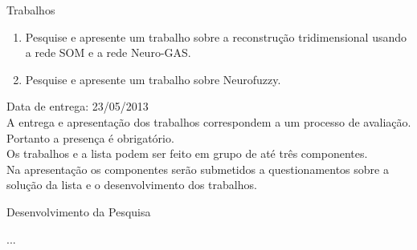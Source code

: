 \documentclass[a4paper,oneside,12pt]{article}
\begin{document}
\newpage

\begin{center}
Trabalhos
\end{center}

\begin{enumerate}[1.]
\item Pesquise e apresente um trabalho sobre a reconstru\c{c}\~ao tridimensional usando a rede SOM e a rede Neuro-GAS. \\

\item Pesquise e apresente um trabalho sobre Neurofuzzy.
\end{enumerate}

Data de entrega: 23/05/2013 \\

A entrega e apresenta\c{c}\~ao dos trabalhos correspondem a um processo de avalia\c{c}\~ao. Portanto a presen\c{c}a \'e obrigat\'orio. \\

Os trabalhos e a lista podem ser feito em grupo de at\'e tr\^es componentes. \\

Na apresenta\c{c}\~ao os componentes ser\~ao submetidos a questionamentos sobre a solu\c{c}\~ao da lista e o desenvolvimento dos trabalhos. \\

\newpage

\begin{center}
Desenvolvimento da Pesquisa
\end{center}

...
\end{document}
